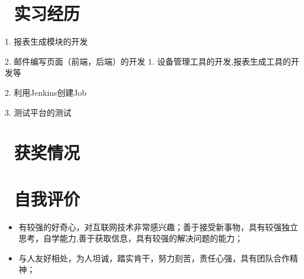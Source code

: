 \documentclass{resume}
\begin{document}
\section{\faUsers\ 实习经历}
1. 报表生成模块的开发

2. 邮件编写页面（前端，后端）的开发
1. 设备管理工具的开发,报表生成工具的开发等

2. 利用Jenkins创建Job  

3. 测试平台的测试





\section{\faHeartO\ 获奖情况}
\begin{itemize}[parsep=0.5ex]

\end{itemize}

\section{\faInfo\ 自我评价}
\begin{itemize}[parsep=0.5ex]
  \item 有较强的好奇心，对互联网技术非常感兴趣；善于接受新事物，具有较强独立思考，自学能力,善于获取信息，具有较强的解决问题的能力；
  \item 与人友好相处，为人坦诚，踏实肯干，努力刻苦，责任心强，具有团队合作精神；
\end{itemize}

%
%
\end{document}
